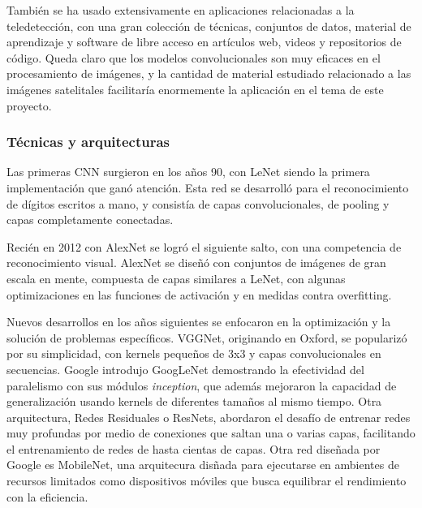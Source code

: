 También se ha usado extensivamente en aplicaciones relacionadas a la teledetección, con una gran colección de técnicas,
conjuntos de datos, material de aprendizaje y software de libre acceso en artículos web, videos y repositorios de
código. \autocite{tds-landuse-classification} \autocite{repo-satellite-image-dl} Queda claro que los modelos
convolucionales son muy eficaces en el procesamiento de imágenes, y la cantidad de material estudiado relacionado a las
imágenes satelitales facilitaría enormemente la aplicación en el tema de este proyecto.

\subsubsection{Técnicas y arquitecturas}

Las primeras CNN surgieron en los años 90, con LeNet siendo la primera implementación que ganó atención. Esta red se
desarrolló para el reconocimiento de dígitos escritos a mano, y consistía de capas convolucionales, de pooling y capas
completamente conectadas.

Recién en 2012 con AlexNet se logró el siguiente salto, con una competencia de reconocimiento visual. AlexNet se diseñó
con conjuntos de imágenes de gran escala en mente, compuesta de capas similares a LeNet, con algunas optimizaciones en
las funciones de activación y en medidas contra overfitting.

Nuevos desarrollos en los años siguientes se enfocaron en la optimización y la solución de problemas específicos.
VGGNet, originando en Oxford, se popularizó por su simplicidad, con kernels pequeños de 3x3 y capas convolucionales en
secuencias. Google introdujo GoogLeNet demostrando la efectividad del paralelismo con sus módulos {\it inception}, que
además mejoraron la capacidad de generalización usando kernels de diferentes tamaños al mismo tiempo. Otra
arquitectura, Redes Residuales o ResNets, abordaron el desafío de entrenar redes muy profundas por medio de conexiones
que saltan una o varias capas, facilitando el entrenamiento de redes de hasta cientas de capas. Otra red diseñada por
Google es MobileNet, una arquitecura disñada para ejecutarse en ambientes de recursos limitados como dispositivos
móviles que busca equilibrar el rendimiento con la eficiencia.

